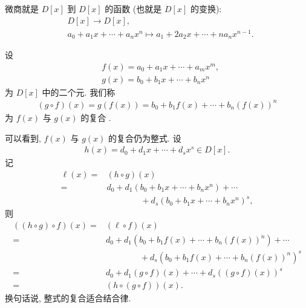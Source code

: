 \begin{remark}
    微商就是 $D[x]$ 到 $D[x]$ 的函数 (也就是 $D[x]$ 的变换):
    \begin{align*}
         & D[x] \to D[x], \tag*{$\prime \colon$}                                        \\
         & a_0 + a_1 x + \cdots + a_n x^n \mapsto a_1 + 2a_2 x + \cdots + na_n x^{n-1}.
    \end{align*}
\end{remark}

\begin{definition}
    设
    \begin{align*}
         & f(x) = a_0 + a_1 x + \cdots + a_m x^m, \\
         & g(x) = b_0 + b_1 x + \cdots + b_n x^n
    \end{align*}
    为 $D[x]$ 中的二个元. 我们称
    \begin{align*}
        (g \circ f)(x) = g(f(x)) = b_0 + b_1 f(x) + \cdots + b_n (f(x))^n
    \end{align*}
    为 $f(x)$ 与 $g(x)$ 的复合 .
\end{definition}

\begin{remark}
    可以看到, $f(x)$ 与 $g(x)$ 的复合仍为整式. 设
    \begin{align*}
        h(x) = d_0 + d_1 x + \cdots + d_s x^s \in D[x].
    \end{align*}
    记
    \begin{align*}
        \ell(x)
        = {} & (h \circ g) (x)                                         \\
        = {} & d_0 + d_1 (b_0 + b_1 x + \cdots + b_n x^n) + \cdots     \\
             & \qquad \qquad + d_s (b_0 + b_1 x + \cdots + b_n x^n)^s,
    \end{align*}
    则
    \begin{align*}
        ((h \circ g) \circ f) (x)
        = {} & (\ell \circ f) (x)                                             \\
        = {} & d_0 + d_1 (b_0 + b_1 f(x) + \cdots + b_n (f(x))^n) + \cdots    \\
             & \qquad \qquad + d_s (b_0 + b_1 f(x) + \cdots + b_n (f(x))^n)^s \\
        = {} & d_0 + d_1 (g \circ f) (x) + \cdots + d_s ((g \circ f) (x))^s   \\
        = {} & (h \circ (g \circ f)) (x).
    \end{align*}
    换句话说, 整式的复合适合结合律.
\end{remark}

